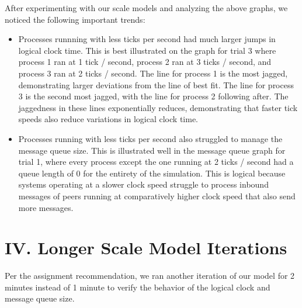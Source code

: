 \documentclass[
	a4paper, %
	10pt, %
	unnumberedsections, %
	twoside, %
]{LTJournalArticle}
\begin{document}
\vspace{1mm}

After experimenting with our scale models and analyzing the above graphs, we noticed the following important trends: 
\begin{itemize}
    \item Processes runnning with less ticks per second had much larger jumps in logical clock time. This is best illustrated on the graph for trial 3 where process 1 ran at 1 tick / second, process 2 ran at 3 ticks / second, and process 3 ran at 2 ticks / second. The line for process 1 is the most jagged, demonstrating larger deviations  from the line of best fit. The line for process 3 is the second most jagged, with the line for process 2 following after. The jaggedness in these lines exponentially reduces, demonstrating that faster tick speeds also reduce variations in logical clock time. 
    \item Processes running with less ticks per second also struggled to manage the message queue size. This is illustrated well in the message queue graph for trial 1, where every process except the one running at 2 ticks / second had a queue length of 0 for the entirety of the simulation. This is logical because systems operating at a slower clock speed struggle to process inbound messages of peers running at comparatively higher clock speed that also send more messages.
\end{itemize}

\section{IV. Longer Scale Model Iterations}

Per the assignment recommendation, we ran another iteration of our model for 2 minutes instead of 1 minute to verify the behavior of the logical clock and message queue size. 


\end{document}
